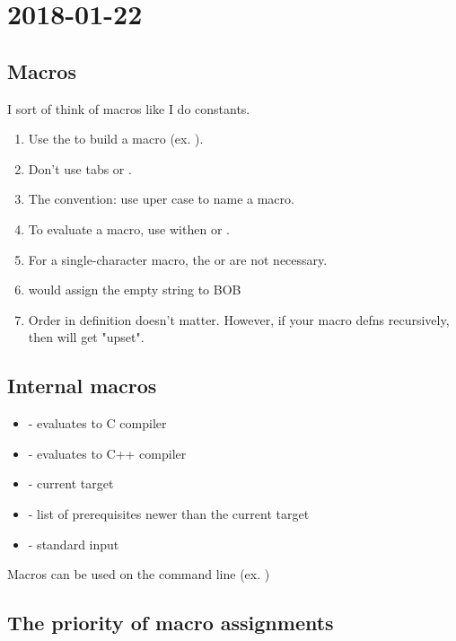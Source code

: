 \section{2018-01-22}


\subsection{Macros}

I sort of think of macros like I do constants.

\begin{enumerate}
  \item Use the \shellcmd{=} to build a macro (ex. ).
  \item Don't use tabs or \shellcmd{:}.
  \item The convention: use uper case to name a macro.
  \item To evaluate a macro, use withen \shellcmd{\$\{----\}} or \shellcmd{\$(----)}.
  \item For a single-character macro, the \shellcmd{\{\}} or \shellcmd{()} are not necessary.
  \item {} would assign the empty string to BOB
  \item Order in definition doesn't matter. However, if your macro defns recursively, then  will get "upset".
\end{enumerate}

\subsection{Internal macros}

\begin{itemize}
  \item {} - evaluates to C compiler
  \item {} - evaluates to C++ compiler
  \item {} - current target
  \item {} - list of prerequisites newer than the current target
  \item \shellcmd{\$<} - standard input
\end{itemize}

Macros can be used on the command line (ex. )

\subsection{The priority of macro assignments}
 
